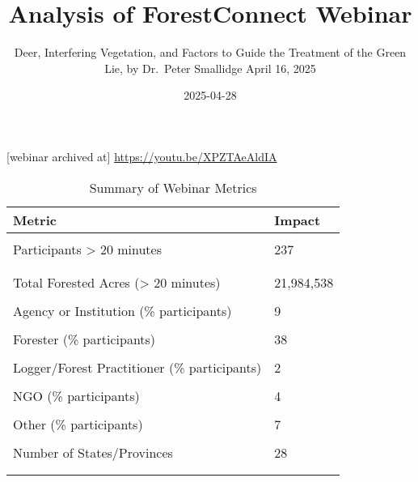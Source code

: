 \documentclass[
]{article}
\title{Analysis of ForestConnect Webinar}
\author{Deer, Interfering Vegetation, and Factors to Guide the Treatment
of the Green Lie, by Dr.~Peter Smallidge April 16, 2025}
\date{2025-04-28}
\begin{document}
\maketitle

{[}webinar archived at{]} \url{https://youtu.be/XPZTAeAldIA}

\begin{longtable}[t]{ll}
\caption{\label{tab:unnamed-chunk-11}Summary of Webinar Metrics}\\
\toprule
\begingroup\fontsize{14}{16}\selectfont \textbf{Metric}\endgroup & \begingroup\fontsize{14}{16}\selectfont \textbf{Impact}\endgroup\\
\midrule
\cellcolor{gray!10}{Number Registered} & \cellcolor{gray!10}{245}\\
\midrule
Participants > 20 minutes & 237\\
\midrule\\
\cellcolor{gray!10}{Number of Survey Respondents} & \cellcolor{gray!10}{133}\\
\midrule
Total Forested Acres (> 20 minutes) & 21,984,538\\
\midrule
\cellcolor{gray!10}{Total Forested Acres (Qualtrics respondents)} & \cellcolor{gray!10}{1,588,333}\\
\midrule
\addlinespace
Agency or Institution (\% participants) & 9\\
\midrule
\cellcolor{gray!10}{Educator (\% participants)} & \cellcolor{gray!10}{4}\\
\midrule
Forester (\% participants) & 38\\
\midrule
\cellcolor{gray!10}{Grazier or Farmer (\% participants)} & \cellcolor{gray!10}{0}\\
\midrule
Logger/Forest Practitioner (\% participants) & 2\\
\midrule
\addlinespace
\cellcolor{gray!10}{Maple Producer (\% participants)} & \cellcolor{gray!10}{0}\\
\midrule
NGO (\% participants) & 4\\
\midrule
\cellcolor{gray!10}{Natural Resources Specialist (\% participants)} & \cellcolor{gray!10}{6}\\
\midrule
Other (\% participants) & 7\\
\midrule
\cellcolor{gray!10}{Woodland Owner (\% participants)} & \cellcolor{gray!10}{31}\\
\midrule
\addlinespace
Number of States/Provinces & 28\\
\midrule\\
\cellcolor{gray!10}{\# Respondents Intending Actions} & \cellcolor{gray!10}{99}\\

\end{longtable}
\end{document}
